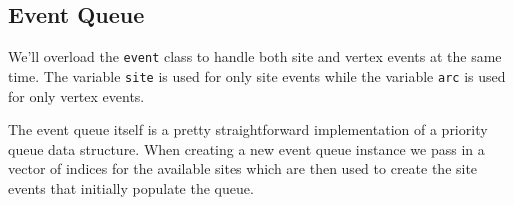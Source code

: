 \documentclass[
  letterpaper,
  DIV=11,
  numbers=noendperiod]{scrartcl}
\newenvironment{Shaded}{\begin{snugshade}}{\end{snugshade}}
\newcommand{\AttributeTok}[1]{\textcolor[rgb]{0.40,0.45,0.13}{#1}}
\newcommand{\ConstantTok}[1]{\textcolor[rgb]{0.56,0.35,0.01}{#1}}
\newcommand{\ControlFlowTok}[1]{\textcolor[rgb]{0.00,0.23,0.31}{#1}}
\newcommand{\FunctionTok}[1]{\textcolor[rgb]{0.28,0.35,0.67}{#1}}
\newcommand{\NormalTok}[1]{\textcolor[rgb]{0.00,0.23,0.31}{#1}}
\newcommand{\OtherTok}[1]{\textcolor[rgb]{0.00,0.23,0.31}{#1}}
\newcommand{\SpecialCharTok}[1]{\textcolor[rgb]{0.37,0.37,0.37}{#1}}
\newcommand{\StringTok}[1]{\textcolor[rgb]{0.13,0.47,0.30}{#1}}
\begin{document}
\subsection{Event Queue}\label{event-queue}

We'll overload the \texttt{event} class to handle both site and vertex
events at the same time. The variable \texttt{site} is used for only
site events while the variable \texttt{arc} is used for only vertex
events.

\begin{Shaded}
\end{Shaded}

The event queue itself is a pretty straightforward implementation of a
priority queue data structure. When creating a new event queue instance
we pass in a vector of indices for the available sites which are then
used to create the site events that initially populate the queue.
\end{document}
